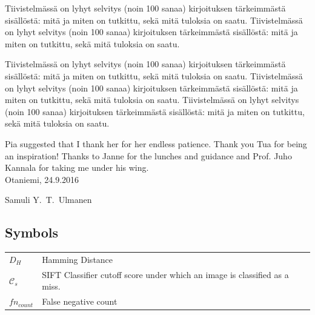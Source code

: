 \documentclass[english,12pt,a4paper,pdftex,elec,utf8]{aaltothesis}
\begin{document}
\begin{abstractpage}[finnish]
  Tiivistelmässä on lyhyt selvitys (noin 100 sanaa)
  kirjoituksen tärkeimmästä sisällöstä: mitä ja miten on tutkittu,
  sekä mitä tuloksia on saatu.
  Tiivistelmässä on lyhyt selvitys (noin 100 sanaa)
  kirjoituksen tärkeimmästä sisällöstä: mitä ja miten on tutkittu,
  sekä mitä tuloksia on saatu.

  Tiivistelmässä on lyhyt selvitys (noin 100 sanaa)
  kirjoituksen tärkeimmästä sisällöstä: mitä ja miten on tutkittu,
  sekä mitä tuloksia on saatu.
  Tiivistelmässä on lyhyt selvitys (noin 100 sanaa)
  kirjoituksen tärkeimmästä sisällöstä: mitä ja miten on tutkittu,
  sekä mitä tuloksia on saatu.
  Tiivistelmässä on lyhyt selvitys (noin 100 sanaa)
  kirjoituksen tärkeimmästä sisällöstä: mitä ja miten on tutkittu,
  sekä mitä tuloksia on saatu.
\end{abstractpage}

\newpage

Pia suggested that I thank her for her endless patience. Thank you Tua for being an inspiration! Thanks to Janne for the lunches and guidance and Prof. Juho Kannala for taking me under his wing.\\

\vspace{5cm}
Otaniemi, 24.9.2016

\vspace{5mm}
{\hfill Samuli Y.\ T.\ Ulmanen \hspace{1cm}}

\newpage


\thesistableofcontents


\subsection*{Symbols}

\begin{tabular}{ll}
$D_H$ & Hamming Distance\\
$\mathcal{C}_s$ & SIFT Classifier cutoff score under which an image is classified as a miss.\\
$fn_{count}$ & False negative count\\
\end{tabular}
\end{document}
